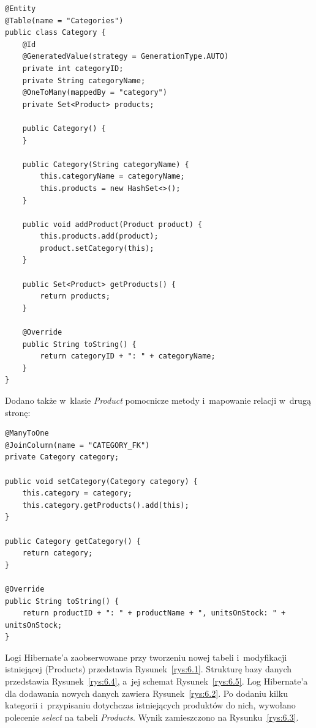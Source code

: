 \documentclass[12pt, a4paper]{mwart}
\begin{document}
\begin{lstlisting}
@Entity
@Table(name = "Categories")
public class Category {
    @Id
    @GeneratedValue(strategy = GenerationType.AUTO)
    private int categoryID;
    private String categoryName;
    @OneToMany(mappedBy = "category")
    private Set<Product> products;

    public Category() {
    }

    public Category(String categoryName) {
        this.categoryName = categoryName;
        this.products = new HashSet<>();
    }

    public void addProduct(Product product) {
        this.products.add(product);
        product.setCategory(this);
    }

    public Set<Product> getProducts() {
        return products;
    }

    @Override
    public String toString() {
        return categoryID + ": " + categoryName;
    }
}
\end{lstlisting}

Dodano także w~klasie \textit{Product} pomocnicze metody i~mapowanie relacji w~drugą stronę:

\begin{lstlisting}
@ManyToOne
@JoinColumn(name = "CATEGORY_FK")
private Category category;

public void setCategory(Category category) {
	this.category = category;
	this.category.getProducts().add(this);
}

public Category getCategory() {
	return category;
}

@Override
public String toString() {
	return productID + ": " + productName + ", unitsOnStock: " + unitsOnStock;
}
\end{lstlisting}

Logi Hibernate'a zaobserwowane przy tworzeniu nowej tabeli i~modyfikacji istniejącej (Products) przedstawia Rysunek~\ref{rys:6.1}. Strukturę bazy danych przedstawia Rysunek~\ref{rys:6.4}, a~jej schemat Rysunek~\ref{rys:6.5}. Log Hibernate'a dla dodawania nowych danych zawiera Rysunek~\ref{rys:6.2}. Po dodaniu kilku kategorii i~przypisaniu dotychczas istniejących produktów do nich, wywołano polecenie \textit{select} na tabeli \textit{Products}. Wynik zamieszczono na Rysunku~\ref{rys:6.3}.
\end{document}
